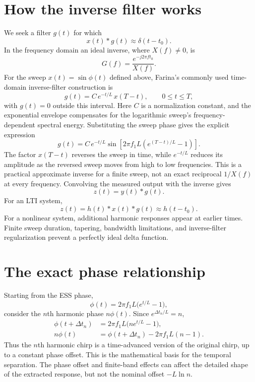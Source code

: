 \documentclass[11pt,a4paper]{article}
\begin{document}
\section{How the inverse filter works}
We seek a filter $g(t)$ for which
\begin{equation}x(t)*g(t)\approx\delta(t-t_0).\end{equation}
In the frequency domain an ideal inverse, where $X(f)\neq0$, is
\begin{equation}G(f)=\frac{e^{-j2\pi ft_0}}{X(f)}.\end{equation}
For the sweep $x(t)=\sin\phi(t)$ defined above, Farina's commonly used time-domain inverse-filter construction is
\begin{equation}
\boxed{g(t)=C\,e^{-t/L}\,x(T-t),\qquad 0\le t\le T,}
\end{equation}
with $g(t)=0$ outside this interval. Here $C$ is a normalization constant, and the exponential envelope compensates for the logarithmic sweep's frequency-dependent spectral energy. Substituting the sweep phase gives the explicit expression
\begin{equation}
\boxed{g(t)=C\,e^{-t/L}\sin\!\left[2\pi f_1L\left(e^{(T-t)/L}-1\right)\right].}
\end{equation}
The factor $x(T-t)$ reverses the sweep in time, while $e^{-t/L}$ reduces its amplitude as the reversed sweep moves from high to low frequencies. This is a practical approximate inverse for a finite sweep, not an exact reciprocal $1/X(f)$ at every frequency. Convolving the measured output with the inverse gives
\begin{equation}z(t)=y(t)*g(t).\end{equation}
For an LTI system,
\begin{equation}z(t)=h(t)*x(t)*g(t)\approx h(t-t_0).\end{equation}
For a nonlinear system, additional harmonic responses appear at earlier times. Finite sweep duration, tapering, bandwidth limitations, and inverse-filter regularization prevent a perfectly ideal delta function.

\section{The exact phase relationship}
Starting from the ESS phase,
\begin{equation}\phi(t)=2\pi f_1L\bigl(e^{t/L}-1\bigr),\end{equation}
consider the $n$th harmonic phase $n\phi(t)$. Since $e^{\Delta t_n/L}=n$,
\begin{align}
\phi(t+\Delta t_n)&=2\pi f_1L\bigl(ne^{t/L}-1\bigr),\\
n\phi(t)&=\phi(t+\Delta t_n)-2\pi f_1L(n-1).
\end{align}
Thus the $n$th harmonic chirp is a time-advanced version of the original chirp, up to a constant phase offset. This is the mathematical basis for the temporal separation. The phase offset and finite-band effects can affect the detailed shape of the extracted response, but not the nominal offset $-L\ln n$.
\end{document}
